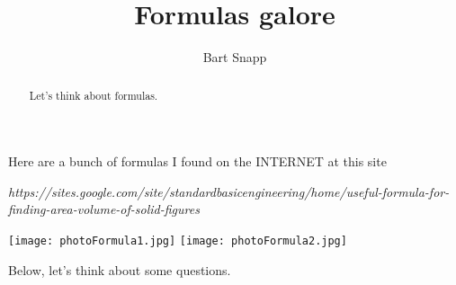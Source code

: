 \documentclass[handout,nooutcomes,noauthor]{ximera}
\title{Formulas galore}
\author{Bart Snapp}
\begin{document}
\begin{abstract}
  Let's think about formulas.
\end{abstract}
\maketitle


\begin{listOutcomes}
\item 
\end{listOutcomes}


Here are a bunch of formulas I found on the INTERNET at this site
\begin{center}
  \textit{https://sites.google.com/site/standardbasicengineering/home/useful-formula-for-finding-area-volume-of-solid-figures}
\end{center}
\begin{center}
  \texttt{[image: photoFormula1.jpg]} \qquad \texttt{[image: photoFormula2.jpg]}
\end{center}

Below, let's think about some questions.



\mynewpage



\begin{question}
\end{question}

\mynewpage


\begin{question}
\end{question}

\mynewpage


\begin{question}
\end{question}



\end{document}
